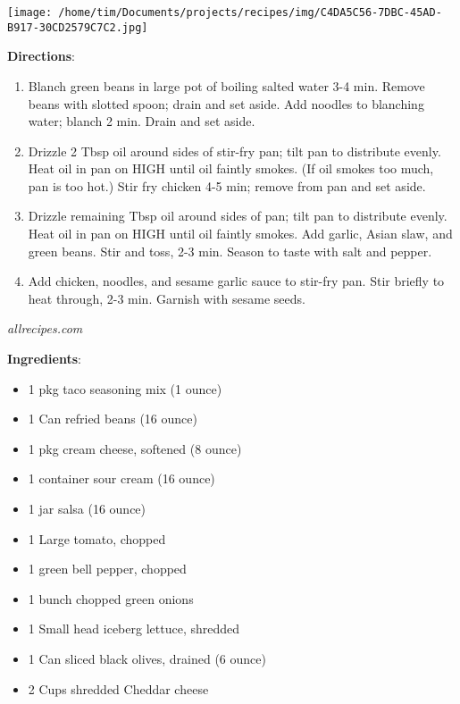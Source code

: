 \documentclass[11pt, twoside, openany]{book}
\begin{document}
\begin{minipage}[t]{0.2\linewidth}
\centering \strut\vspace*{-\baselineskip}\newline
\texttt{[image: /home/tim/Documents/projects/recipes/img/C4DA5C56-7DBC-45AD-B917-30CD2579C7C2.jpg]}\\
\end{minipage}\vspace{3mm}
\textbf{Directions}:
\vspace{-3mm}\begin{enumerate}\setlength\itemsep{-1mm}
\item Blanch green beans in large pot of boiling salted water 3-4 min. Remove beans with slotted spoon; drain and set aside. Add noodles to blanching water; blanch 2 min. Drain and set aside.
\item Drizzle 2 Tbsp oil around sides of stir-fry pan; tilt pan to distribute evenly. Heat oil in pan on HIGH until oil faintly smokes. (If oil smokes too much, pan is too hot.) Stir fry chicken 4-5 min; remove from pan and set aside. 
\item Drizzle remaining Tbsp oil around sides of pan; tilt pan to distribute evenly. Heat oil in pan on HIGH until oil faintly smokes. Add garlic, Asian slaw, and green beans. Stir and toss, 2-3 min. Season to taste with salt and pepper.
\item Add chicken, noodles, and sesame garlic sauce to stir-fry pan. Stir briefly to heat through, 2-3 min. Garnish with sesame seeds.
\end{enumerate}
 \label{seven-layer-taco-dip}\hfill\textit{allrecipes.com}\\
\begin{minipage}[t]{0.8\linewidth}
\textbf{Ingredients}:\vspace{-3mm}
\begin{multicols}{2}
\begin{itemize}\setlength\itemsep{-1mm}
\item 1 pkg taco seasoning mix (1 ounce)
\item 1 Can refried beans (16 ounce)
\item 1 pkg cream cheese, softened (8 ounce)
\item 1 container sour cream (16 ounce)
\item 1 jar salsa (16 ounce)
\item 1 Large tomato, chopped
\item 1 green bell pepper, chopped
\item 1 bunch chopped green onions
\item 1 Small head iceberg lettuce, shredded
\item 1 Can sliced black olives, drained (6 ounce)
\item 2 Cups shredded Cheddar cheese
\end{itemize}
\end{multicols}
\end{minipage}
\end{document}
